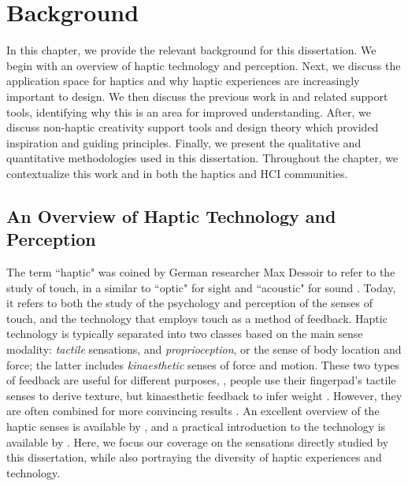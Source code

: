 
\chapter{Background}
\label{ch:rw}

In this chapter, we provide the relevant background for this dissertation.
We begin with an overview of haptic technology and perception.
Next, we discuss the application space for haptics and why haptic experiences are increasingly important to design.
We then discuss the previous work in \haxd and related support tools, identifying why this is an area for improved understanding.
After, we discuss non-haptic creativity support tools and design theory which provided inspiration and guiding principles.
Finally, we present the qualitative and quantitative methodologies used in this dissertation.
Throughout the chapter, we contextualize this work and \haxd in both the haptics and HCI communities.


%
%
\section{An Overview of Haptic Technology and Perception}
The term ``haptic" was coined by German researcher Max Dessoir to refer to the study of touch, in a similar to ``optic" for sight and ``acoustic" for sound \cite{Grunwald2008}.
Today, it refers to both the study of the psychology and perception of the senses of touch, and the technology that employs touch as a method of feedback.
Haptic technology is typically separated into two classes based on the main sense modality: \emph{tactile} sensations, and \emph{proprioception}, or the sense of body location and force;  the latter includes \emph{kinaesthetic} senses of force and motion.
These two types of feedback are useful for different purposes, \eg, people use their fingerpad's tactile senses to derive texture, but kinaesthetic feedback to infer weight \cite{Lederman1987}.
However, they are often combined for more convincing results \cite{Okamura1998}.
An excellent overview of the haptic senses is available by \citet{Lederman2009survey}, and a practical introduction to the technology is available by \citet{Hayward2007}.
Here, we focus our coverage on the sensations directly studied by this dissertation, while also portraying the diversity of haptic experiences and technology.

